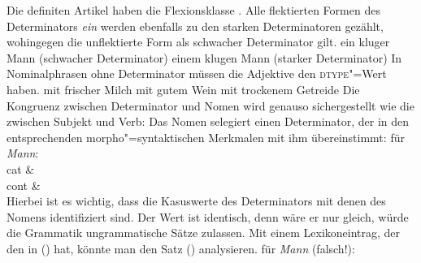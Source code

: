 Die definiten Artikel haben die Flexionsklasse . Alle flektierten Formen
des Determinators \emph{ein} werden ebenfalls zu den starken Determinatoren gezählt,
wohingegen die unflektierte Form als schwacher Determinator gilt.
\eal
\ex ein kluger Mann   (schwacher Determinator)
\ex einem klugen Mann (starker Determinator)
\zl
In Nominalphrasen ohne Determinator müssen die Adjektive den \textsc{dtype}"=Wert  haben.
\eal
\ex mit frischer Milch
\ex mit gutem Wein
\ex mit trockenem Getreide
\zl
Die Kongruenz zwischen Determinator und Nomen wird genauso sichergestellt wie die zwischen Subjekt und Verb:
Das Nomen selegiert einen Determinator, der in den entsprechenden morpho"=syntaktischen Merkmalen
mit ihm übereinstimmt:
\eas
\label{le-mann}%
\localw für \emph{Mann}:\\
\ms
{ cat &  \\
  cont &  \\
}
\zs
Hierbei ist es wichtig, dass die Kasuswerte des Determinators mit denen des Nomens
identifiziert sind. Der Wert ist identisch, denn wäre er nur gleich, würde die Grammatik
ungrammatische Sätze zulassen. Mit einem Lexikoneintrag, der den \catw in () hat,
könnte man den Satz () analysieren.
\ea
\catw für \emph{Mann} (falsch!):\\
